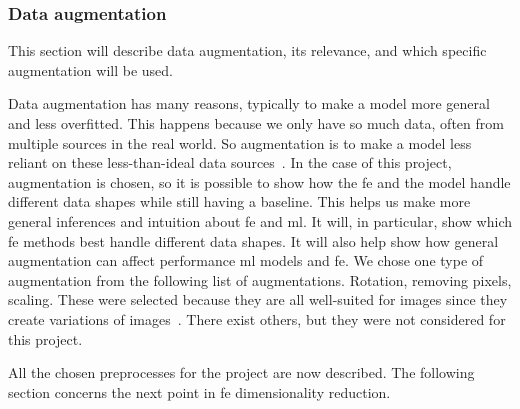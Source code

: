 \subsubsection{Data augmentation}\label{subsec:data-augmentation}
This section will describe data augmentation, its relevance, and which specific augmentation will be used.


Data augmentation has many reasons, typically to make a model more general and less overfitted. This happens because we only have so much data, often from multiple sources in the real world. So augmentation is to make a model less reliant on these less-than-ideal data sources~\cite{MAHARANA202291}.
In the case of this project, augmentation is chosen, so it is possible to show how the \gls{fe} and the model handle different data shapes while still having a baseline. This helps us make more general inferences and intuition about \gls{fe} and \gls{ml}. It will, in particular, show which \gls{fe} methods best handle different data shapes. It will also help show how general augmentation can affect performance \gls{ml} models and \gls{fe}.
We chose one type of augmentation from the following list of augmentations. Rotation, removing pixels, scaling. These were selected because they are all well-suited for images since they create variations of images~\cite{gonzalez2008digital}. There exist others, but they were not considered for this project. 
 

All the chosen preprocesses for the project are now described. The following section concerns the next point in \gls{fe} dimensionality reduction. 




